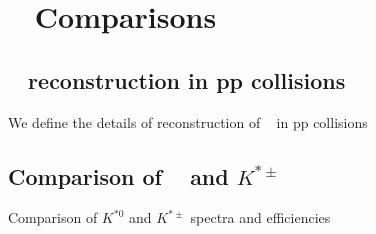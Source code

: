 \chapter{\kzero~ Comparisons}
\label{cap:6}
\vspace*{2cm}


\section{\kzero~ reconstruction in pp collisions}
\label{par:6.1}
We define the details of reconstruction of \kzero~ in pp collisions

\section{Comparison of \kzero~ and $K^{*\pm}$}
\label{par:6.2}
Comparison of $K^{*0}$ and $K^{*\pm}$ spectra and efficiencies